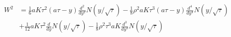 \documentclass[10pt]{article}
\numberwithin{equation}{section}
\begin{document}
\begin{equation*}
	\begin{split}
	W^{2}&=  \frac{1}{6} a K \tau^2 (a\tau - y) \frac{d^2}{d y^2} N(y/\sqrt{\tau})
	- \frac{1}{8} \rho^2 a K \tau^3 ( a\tau - y )  \frac{d^4}{d y^4} N(y/\sqrt{\tau})\\
	&+\frac{1}{12} a K \tau^2 \frac{d}{d y} N(y/\sqrt{\tau})
	-\frac{1}{8} \rho^2 \tau^3 a K \frac{d^3}{d y^3} N(y/\sqrt{\tau})
	\end{split}
\end{equation*}


\end{document}
